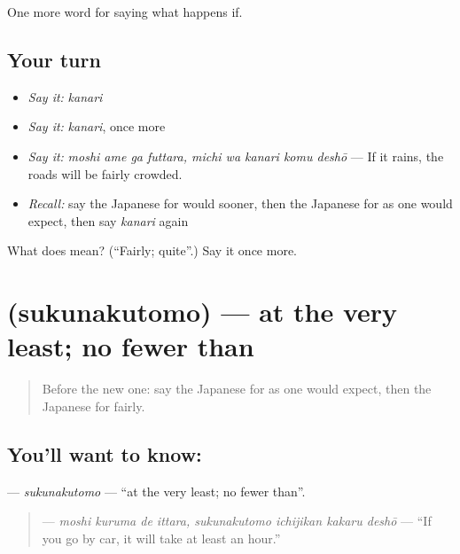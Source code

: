 \begin{grammarlens}[title={What you've built}]
One more word for saying what happens if.
\end{grammarlens}

\subsection*{Your turn}
\begin{itemize}
\raggedright
  \item \emph{Say it:} \emph{kanari}
  \item \emph{Say it:} \emph{kanari}, once more
  \item \emph{Say it:} \emph{moshi ame ga futtara, michi wa kanari komu deshō} — If it rains, the roads will be fairly crowded.
  \item \emph{Recall:} say the Japanese for would sooner, then the Japanese for as one would expect, then say \emph{kanari} again
\end{itemize}

\begin{tcolorbox}[breakable,colback=teal!4,colframe=teal!35!black,title={Before you move on}]
What does  mean? (\textquotedblleft{}Fairly; quite\textquotedblright{}.) Say it once more.
\end{tcolorbox}
\section[\texorpdfstring{\ja{すくなくとも} (sukunakutomo)}{すくなくとも (sukunakutomo)}]{ (sukunakutomo) — at the very least; no fewer than}

\label{lesson:JA-C530-sukunakutomo}



\begin{quote}
Before the new one: say the Japanese for as one would expect, then the Japanese for fairly.
\end{quote}

\subsection*{You'll want to know: }
\textbf{} — \emph{sukunakutomo} — \textquotedblleft{}at the very least; no fewer than\textquotedblright{}.

\begin{quote}
\textbf{    } — \emph{moshi kuruma de ittara, sukunakutomo ichijikan kakaru deshō} — \textquotedblleft{}If you go by car, it will take at least an hour.\textquotedblright{}
\end{quote}

